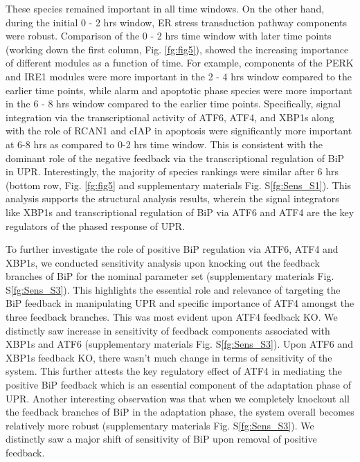 \documentclass[fleqn,10pt]{wlscirep}
\begin{document}
These species remained important in all time windows. On the other hand, during the initial 0 - 2 hrs window, ER stress transduction pathway components were robust. Comparison of the 0 - 2 hrs time window with later time points (working down the first column, Fig. \ref{fg:fig5}), showed the increasing importance of different modules as a function of time.
For example, components of the PERK and IRE1 modules were more important in the 2 - 4 hrs window compared to the earlier time points, while alarm and apoptotic phase species were more important in the 6 - 8 hrs window compared to the earlier time points.
Specifically, signal integration via the transcriptional activity of ATF6, ATF4, and XBP1s along with the role of RCAN1 and cIAP in apoptosis were significantly more important at 6-8 hrs as compared to 0-2 hrs time window.
This is consistent with the dominant role of the negative feedback via the transcriptional regulation of BiP in UPR. Interestingly, the majority of species rankings were similar after 6 hrs (bottom row,  Fig. \ref{fg:fig5} and supplementary materials Fig. S\ref{fg:Sens_S1}).
This analysis supports the structural analysis results, wherein the signal integrators like XBP1s and transcriptional regulation of BiP via ATF6 and ATF4 are the key regulators of the phased response of UPR.

To further investigate the role of positive BiP regulation via ATF6, ATF4 and XBP1s, we conducted sensitivity analysis upon knocking out the feedback branches of BiP for the nominal parameter set (supplementary materials Fig. S\ref{fg:Sens_S3}).
This highlights the essential role and relevance of targeting the BiP feedback in manipulating UPR and  specific importance of ATF4 amongst the three feedback branches.
This was most evident upon ATF4 feedback KO. We distinctly saw increase in sensitivity of feedback components associated with XBP1s and ATF6 (supplementary materials Fig. S\ref{fg:Sens_S3}).
Upon ATF6 and XBP1s feedback KO, there wasn't much change in terms of sensitivity of the system. This further attests the key regulatory effect of ATF4 in mediating the positive BiP feedback which is an essential component of the adaptation phase of UPR.
Another interesting observation was that when we completely knockout all the feedback branches of BiP in the adaptation phase, the system overall becomes relatively more robust (supplementary materials Fig. S\ref{fg:Sens_S3}).
We distinctly saw a major shift of sensitivity of BiP upon removal of positive feedback.
\end{document}
